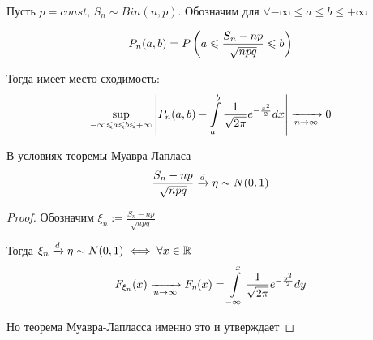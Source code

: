 \begin{theorem}~

  Пусть $p = const$, $S_n \sim Bin(n, p)$. 
  Обозначим для $\forall -\infty \leq a \leq b \leq +\infty$

  \begin{align*}
    P_n (a, b) = P\left( a \leqslant \frac{S_n - np}{\sqrt{npq}} \leqslant b \right)
  \end{align*}

  Тогда имеет место сходимость:
  \begin{align*}
    \sup_{-\infty \leqslant a \leqslant b \leqslant +\infty} 
      \left | P_n(a, b) - \int\limits_{a}^{b} \frac{1}{\sqrt{2\pi}} e^{-\frac{x^2}{2}} dx \right | 
      \xrightarrow[n \to \infty]{} 0
  \end{align*}
\end{theorem}

\begin{corollary}
  В условиях теоремы Муавра-Лапласа
  \begin{align*}
    \frac{S_n - np}{\sqrt{npq}} \xrightarrow{d} \eta \sim N(0, 1)
  \end{align*}

  \begin{proof}
    Обозначим $\xi_n := \frac{S_n - np}{\sqrt{npq}}$

    Тогда $\xi_n \xrightarrow{d} \eta \sim N(0, 1) \iff \forall x \in \mathbb{R}$
    \begin{align*}
      F_{\xi_n} (x) \xrightarrow[n \to \infty]{} F_{\eta} (x) 
      = \int\limits_{-\infty}^{x} \frac{1}{\sqrt{2\pi}} e^{-\frac{y^2}{2}} dy
    \end{align*}

    Но теорема Муавра-Лапласса именно это и утверждает
  \end{proof}
\end{corollary}

